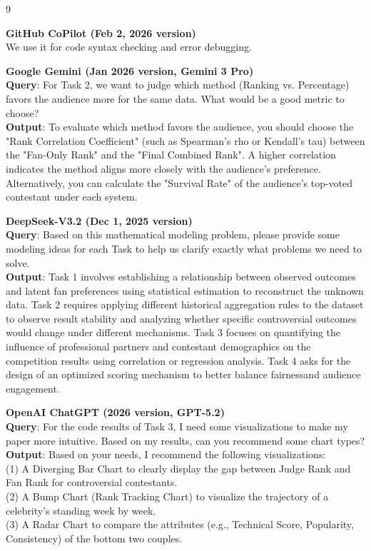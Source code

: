 \AImatter
\begin{ReportAiUse}{9}


\textbf{GitHub CoPilot (Feb 2, 2026 version)}\\
We use it for code syntax checking and error debugging.


\textbf{Google Gemini (Jan 2026 version, Gemini 3 Pro)}\\
\textbf{Query}: For Task 2, we want to judge which method (Ranking vs. Percentage) favors the audience more for the same data. What would be a good metric to choose?\\
\textbf{Output}: To evaluate which method favors the audience, you should choose the "Rank Correlation Coefficient" (such as Spearman's rho or Kendall's tau) between the "Fan-Only Rank" and the "Final Combined Rank". A higher correlation indicates the method aligns more closely with the audience's preference. Alternatively, you can calculate the "Survival Rate" of the audience's top-voted contestant under each system.


\textbf{DeepSeek-V3.2 (Dec 1, 2025 version)}\\
\textbf{Query}: Based on this mathematical modeling problem, please provide some modeling ideas for each Task to help us clarify exactly what problems we need to solve.\\
\textbf{Output}: Task 1 involves establishing a relationship between observed outcomes and latent fan preferences using statistical estimation to reconstruct the unknown data. Task 2 requires applying different historical aggregation rules to the dataset to observe result stability and analyzing whether specific controversial outcomes would change under different mechanisms. Task 3 focuses on quantifying the influence of professional partners and contestant demographics on the competition results using correlation or regression analysis. Task 4 asks for the design of an optimized scoring mechanism to better balance fairnessand audience engagement.


\textbf{OpenAI ChatGPT (2026 version, GPT-5.2)}\\
\textbf{Query}: For the code results of Task 3, I need some visualizations to make my paper more intuitive. Based on my results, can you recommend some chart types?\\
\textbf{Output}: Based on your needs, I recommend the following visualizations: \\(1) A Diverging Bar Chart to clearly display the gap between Judge Rank and Fan Rank for controversial contestants.\\ (2) A Bump Chart (Rank Tracking Chart) to visualize the trajectory of a celebrity's standing week by week.\\ (3) A Radar Chart to compare the attributes (e.g., Technical Score, Popularity, Consistency) of the bottom two couples.


\end{ReportAiUse}
